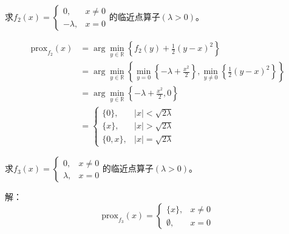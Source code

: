 \begin{example}
    求$f_2(x)=\begin{cases}0,&x\neq0\\[2ex]-\lambda,&x=0\end{cases}$的临近点算子$(\lambda>0)$。

    \[
        \begin{aligned}
            \mathrm{prox}_{f_{2}}(x)& =\arg\min_{y\in\mathbb{R}}\left\{f_{2}(y)+\frac{1}{2}(y-x)^{2}\right\}  \\
            &=\arg\min_{y\in\mathbb{R}}\left\{\min_{y=0}\left\{-\lambda+\frac{x^{2}}{2}\right\},\min_{y\neq0}\left\{\frac{1}{2}(y-x)^{2}\right\}\right\} \\
            &=\arg\min_{y\in\mathbb{R}}\left\{-\lambda+\frac{x^{2}}{2},0\right\} \\
            &\left.=\left\{\begin{array}{ll}\{0\},&|x|<\sqrt{2\lambda}\\[2ex]\{x\},&|x|>\sqrt{2\lambda}\\[2ex]\{0,x\},&|x|=\sqrt{2\lambda}\end{array}\right.\right.
        \end{aligned}
    \]    
\end{example}
\begin{example}
    求$f_3(x)=\begin{cases}0,&x\neq0\\[2ex]\lambda,&x=0\end{cases}$的临近点算子$(\lambda>0)$。

    解：
    \[
        \mathrm{prox}_{f_3}(x)=
            \left\{
                \begin{array}{cc}
                    \{x\}, & x\neq0\\
                    \emptyset, & x=0
                \end{array}
            \right.
    \]
\end{example}

